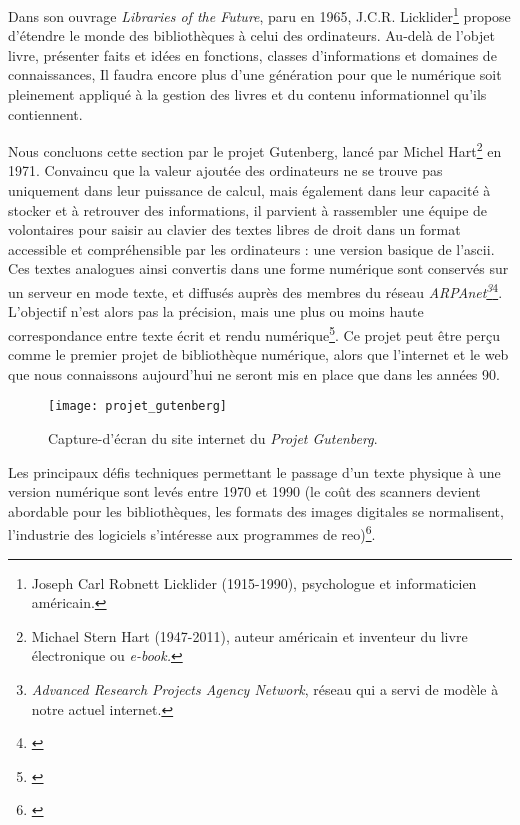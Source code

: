 Dans son ouvrage \emph{Libraries of the Future}, paru en 1965,  J.C.R. Licklider\footnote{Joseph Carl Robnett Licklider (1915-1990), psychologue et informaticien américain.} propose d'étendre le monde des bibliothèques à celui des ordinateurs. Au-delà de l'objet livre, présenter faits et idées en fonctions, classes d'informations et domaines de connaissances,  Il faudra encore plus d'une génération pour que le numérique soit pleinement appliqué à la gestion des livres et du contenu informationnel qu'ils contiennent.

Nous concluons cette section par le projet Gutenberg, lancé par Michel Hart\footnote{Michael Stern Hart (1947-2011), auteur américain et inventeur du livre électronique ou \textit{e-book.}} en 1971. Convaincu que la valeur ajoutée des ordinateurs ne se trouve pas uniquement dans leur puissance de calcul, mais également dans leur capacité à stocker et à retrouver des informations, il parvient à rassembler une équipe de volontaires pour saisir au clavier des textes libres de droit dans un format accessible et compréhensible par les ordinateurs : une version basique de l'\gls{ascii}. Ces textes analogues ainsi convertis dans une forme numérique sont conservés sur un serveur en mode texte, et diffusés auprès des membres du réseau \textit{ARPAnet\footnote{\textit{Advanced Research Projects Agency Network}, réseau qui a servi de modèle à notre actuel internet.}}\footnote{\cite[p. 10]{association_pour_le_patrimoine_naturel_et_culturel_du_canton_de_vaud_patrimoine_2012}}. L'objectif n'est alors pas la précision, mais une plus ou moins haute correspondance entre texte écrit et rendu numérique\footnote{\cite[p. 10]{thylstrup_politics_2018}}. Ce projet peut être perçu comme le premier projet de bibliothèque numérique, alors que l'internet et le web que nous connaissons aujourd'hui ne seront mis en place que dans les années 90.

\newpage
\begin{figure}[H]%
\centering
\texttt{[image: projet\_gutenberg]}
\caption{Capture-d'écran du site internet du \textit{Projet Gutenberg}.}
\end{figure}

Les principaux défis techniques permettant le passage d'un texte physique à une version numérique sont levés entre 1970 et 1990 (le coût des scanners devient abordable pour les bibliothèques, les formats des images digitales se normalisent, l'industrie des logiciels s'intéresse aux programmes de \gls{reo})\footnote{\cite{association_pour_le_patrimoine_naturel_et_culturel_du_canton_de_vaud_patrimoine_2012}}. 


